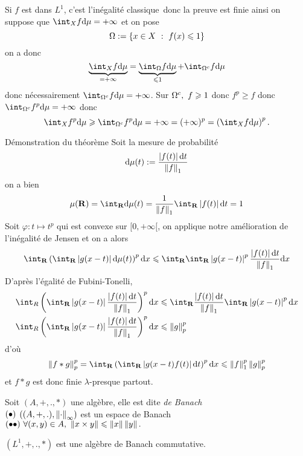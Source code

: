 \documentclass[a4paper,11pt, twoside]{article}
\begin{document}
\begin{Proof}
  Si $f$ est dans $L^1$, c'est l'inégalité \og classique\fg\ donc la preuve est finie ainsi on suppose que $\dstyle\int_Xf\dmu=+\infty$ et on pose 
  $$\Omega:=\left\{x\in X\ :\ f(x)\leqslant 1\right\}$$
  on a donc
  $$\underbrace{\int_Xf\dmu}_{=+\infty}=\underbrace{\int_\O f\dmu}_{\leqslant 1}+\int_{\O^c}f\dmu$$
  donc nécessairement $\dstyle\int_{\O^c}f\dmu=+\infty$. Sur $\Omega^c,\ f\geqslant 1$ donc $f^p\geqslant f$ donc $\dstyle\int_{\O^c}f^p\dmu=+\infty$ donc 
  $$\int_Xf^p\dmu\geqslant \int_{\O^c}f^p\dmu=+\infty=(+\infty)^p=\Par{\int_Xf\dmu}^p.$$
\end{Proof}

\begin{ProofC}{Démonstration du théorème}
  Soit la mesure de probabilité 
  $$\mathrm d\mu(t):=\frac{\left| f(t)\right|\mathrm dt}{\left\lVert f\right\rVert_1}$$
  on a bien 
  $$\mu(\R)=\int_\R\mathrm d\mu(t)=\frac{1}{\norm{f}_1}\int_\R\abs{f(t)}\mathrm dt=1$$
  Soit $\varphi:t\longmapsto t^p$ qui est convexe sur $[0,+\infty[$, on applique notre amélioration de l'inégalité de Jensen et on a alors 
  $$\int_\R\Par{\int_\R\abs{g(x-t)}\mathrm d\mu(t)}^p\mathrm dx\leqslant \int_\R\int_\R\abs{g(x-t)}^p\frac{\abs{f(t)}\mathrm dt}{\norm{f}_1}\mathrm dx$$
  D'après l'égalité de Fubini-Tonelli,
  \begin{align*}
  \int_R\Par{\int_\R\abs{g(x-t)}\frac{\abs{f(t)}\mathrm dt}{\norm{f}_1}}^p\mathrm dx&\leqslant \int_\R\frac{\abs{f(t)}\mathrm dt}{\norm{f}_1}\int_\R\abs{g(x-t)}^p\mathrm dx\\
  \int_R\Par{\int_\R\abs{g(x-t)}\frac{\abs{f(t)}\mathrm dt}{\norm{f}_1}}^p\mathrm dx&\leqslant \norm{g}_p^p
  \end{align*}
  d'où 
  $$\norm{f*g}_p^p=\int_\R\Par{\int_\R\abs{g(x-t)f(t)}\dt}^p\dx\leqslant \norm{f}_1^p\norm{g}_p^p$$
  et $f*g$ est donc finie $\lambda$-presque partout.
\end{ProofC}


\begin{Def}
  Soit $(A,+,.,*)$ une algèbre, elle est dite \emph{de Banach} \ssi\\
  $(\bullet)$ $\left((A,+,.),\left\lVert\cdot\right\rVert_\infty\right)$ est un espace de Banach\\
  $(\bullet\bullet)\ \forall (x,y)\in A,\ \left\lVert x\times y\right\rVert\leqslant \left\lVert x\right\rVert\left\lVert y\right\rVert.$
\end{Def}

\begin{corollaire}
  $(L^1,+,.,*)$ est une algèbre de Banach commutative.
\end{corollaire}
\end{document}
